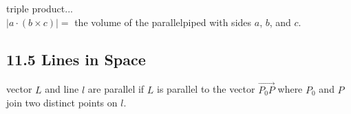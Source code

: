 \documentclass{article} %
\begin{document}
    triple product... \\   
    $|a \cdot (b \times c)|= $ the volume of the parallelpiped with sides $a$, $b$, and $c$.\\

    \subsection*{11.5 Lines in Space}
    vector $L$ and line $l$ are parallel if $L$ is parallel to the vector $\overrightarrow{P_0P}$ where $P_0$ and $P$ join two distinct points on $l$.\\
    
    
    
    
    
    
    
    
    
    
    
    
    
    
    
    
    

    
    
    
    
    
    
    
    
    
    
    
    
    
    
    
    
    
    
\end{document}
